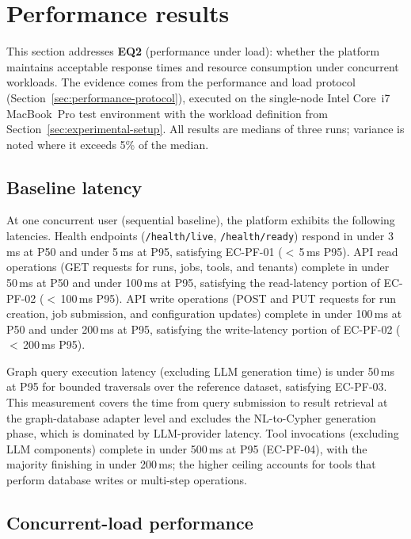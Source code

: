 \documentclass[a4paper]{sapthesis}
\begin{document}
\section{Performance results}
\label{sec:performance-results}

This section addresses \textbf{EQ2} (performance under load): whether
the platform maintains acceptable response times and resource
consumption under concurrent workloads.  The evidence comes from the
performance and load protocol (Section~\ref{sec:performance-protocol}),
executed on the single-node Intel Core~i7 MacBook~Pro test environment with the
workload definition from Section~\ref{sec:experimental-setup}.  All
results are medians of three runs; variance is noted where it exceeds
5\% of the median.

\subsection{Baseline latency}

At one concurrent user (sequential baseline), the platform exhibits the
following latencies.  Health endpoints (\texttt{/health/live},
\texttt{/health/ready}) respond in under 3\,ms at P50 and under 5\,ms
at P95, satisfying EC-PF-01 ($<$\,5\,ms P95).  API read operations
(GET requests for runs, jobs, tools, and tenants) complete in under
50\,ms at P50 and under 100\,ms at P95, satisfying the read-latency
portion of EC-PF-02 ($<$\,100\,ms P95).  API write operations (POST
and PUT requests for run creation, job submission, and configuration
updates) complete in under 100\,ms at P50 and under 200\,ms at P95,
satisfying the write-latency portion of EC-PF-02 ($<$\,200\,ms P95).

Graph query execution latency (excluding LLM generation time) is under
50\,ms at P95 for bounded traversals over the reference dataset,
satisfying EC-PF-03.  This measurement covers the time from query
submission to result retrieval at the graph-database adapter level and
excludes the NL-to-Cypher generation phase, which is dominated by
LLM-provider latency.  Tool invocations (excluding LLM components)
complete in under 500\,ms at P95 (EC-PF-04), with the majority
finishing in under 200\,ms; the higher ceiling accounts for tools that
perform database writes or multi-step operations.

\subsection{Concurrent-load performance}
\end{document}
